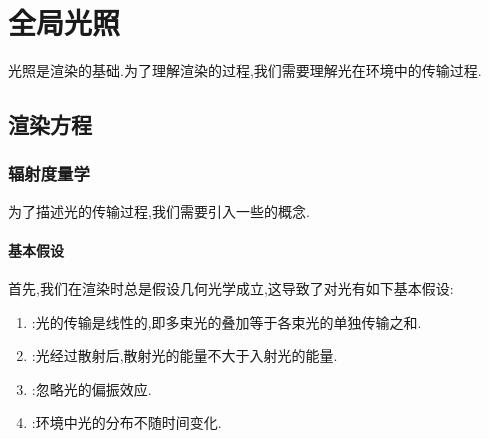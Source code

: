 \documentclass{ctexart}
\begin{document}
\section{全局光照}
光照是渲染的基础.为了理解渲染的过程,我们需要理解光在环境中的传输过程.
\subsection{渲染方程}
\subsubsection{辐射度量学}
为了描述光的传输过程,我们需要引入一些的概念.
\paragraph{基本假设}
首先,我们在渲染时总是假设几何光学成立,这导致了对光有如下基本假设:
\begin{theorem}[光的基本假设]
    \begin{enumerate}[label=\tbf{\arabic*.}]
        \item {}:光的传输是线性的,即多束光的叠加等于各束光的单独传输之和.
        \item {}:光经过散射后,散射光的能量不大于入射光的能量.
        \item {}:忽略光的偏振效应.
        \item {}:环境中光的分布不随时间变化.
    \end{enumerate}
\end{theorem}
\end{document}
